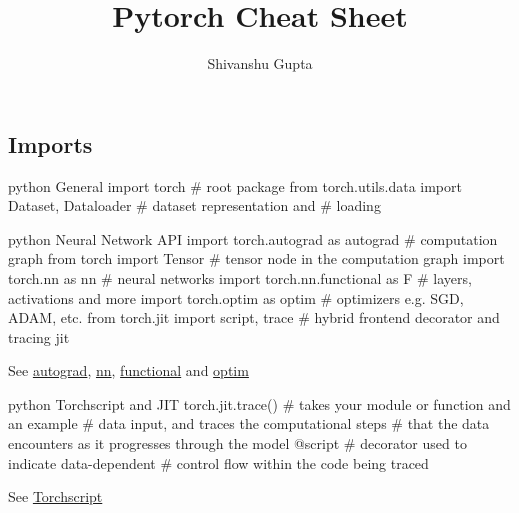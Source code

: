 \documentclass[8pt]{extarticle}
\date{}
\title{Pytorch Cheat Sheet}
\author{Shivanshu Gupta}
\date{}
\begin{document}
\begin{multicols}{2}
\maketitle
\vspace{-12ex}

\hypertarget{imports}{%
\section{Imports}\label{imports}}

\begin{codebox}{python}{\hypertarget{general}{%
General\label{general}}}
import torch                                        # root package
from torch.utils.data import Dataset, Dataloader    # dataset representation and 
                                                    # loading
\end{codebox}

\begin{codebox}{python}{\hypertarget{neural-network-api}{%
Neural Network API\label{neural-network-api}}}
import torch.autograd as autograd     # computation graph
from torch import Tensor              # tensor node in the computation graph
import torch.nn as nn                 # neural networks
import torch.nn.functional as F       # layers, activations and more
import torch.optim as optim           # optimizers e.g. SGD, ADAM, etc.
from torch.jit import script, trace   # hybrid frontend decorator and tracing jit
\end{codebox}

See \href{https://pytorch.org/docs/stable/autograd.html}{autograd},
\href{https://pytorch.org/docs/stable/nn.html}{nn},
\href{https://pytorch.org/docs/stable/nn.html\#torch-nn-functional}{functional}
and \href{https://pytorch.org/docs/stable/optim.html}{optim}

\begin{codebox}{python}{\hypertarget{torchscript-and-jit}{%
Torchscript and JIT\label{torchscript-and-jit}}}
torch.jit.trace()   # takes your module or function and an example
                    # data input, and traces the computational steps
                    # that the data encounters as it progresses through the model
@script             # decorator used to indicate data-dependent
                    # control flow within the code being traced
\end{codebox}

See \href{https://pytorch.org/docs/stable/jit.html}{Torchscript}


\end{multicols}
\end{document}
